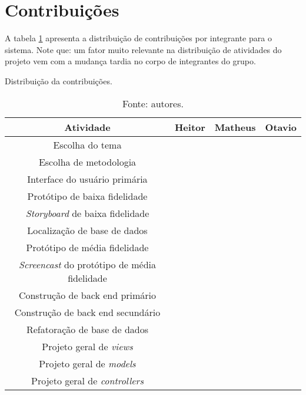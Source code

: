 \section{Contribuições}

A tabela \ref{tab:contribuicoes} apresenta a distribuição de contribuições por integrante para o sistema. Note que: um fator muito relevante na distribuição de atividades do projeto vem com a mudança tardia no corpo de integrantes do grupo.

\begin{table}[H]
	\centering
	\caption{Distribuição da contribuições.}
	\label{tab:contribuicoes}
	\begin{tabular}{cccc}
		\toprule
	Atividade 				           						& Heitor & Matheus & Otavio \\ \midrule
		Escolha do tema                    					& \x     & \g      & \x  \\ \cmidrule{1-1}
		Escolha de metodologia             					& \g     & \g      & \x  \\ \cmidrule{1-1}
		Interface do usuário primária                       & \x  	 & \g 	   & \g  \\ \cmidrule{1-1}
		Protótipo de baixa fidelidade 						& \x  	 & \g      & \g  \\ \cmidrule{1-1}
		\emph{Storyboard} de baixa fidelidade 				& \x  	 & \g      & \g  \\ \cmidrule{1-1}
		Localização de base de dados     					& \g  	 & \x      & \g  \\ \cmidrule{1-1}
		Protótipo de média fidelidade 						& \x  	 & \g      & \g  \\ \cmidrule{1-1}
		\emph{Screencast} do protótipo de média fidelidade 	& \x  	 & \g      & \g  \\ \cmidrule{1-1}
		Construção de back end primário 					& \x  	 & \g      & \x  \\ \cmidrule{1-1}
		Construção de back end secundário 					& \g  	 & \g      & \x  \\ \cmidrule{1-1}
		Refatoração de base de dados     					& \g  	 & \x      & \g  \\ \cmidrule{1-1}
		Projeto geral de \emph{views}          				& \x  	 & \g      & \g  \\ \cmidrule{1-1}
		Projeto geral de \emph{models}          			& \x  	 & \g      & \x  \\ \cmidrule{1-1}
		Projeto geral de \emph{controllers}          		& \g  	 & \g      & \x  \\
		\bottomrule
	\end{tabular}
	\vspace{1em}
	\caption*{Fonte: autores.}\end{table}